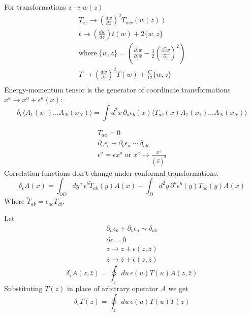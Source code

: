 \documentclass[a4paper,12pt]{article}
\theoremstyle{definition} \newtheorem{Def}{Definition}
\begin{document}
For transformations $z\to w(z)$
\begin{equation}
  \label{eq:51}
  \begin{split}
    T_{zz}\to \left(\frac{dw}{dz}\right)^2 T_{ww}(w(z))\\
    t\to \left(\frac{dw}{dz}\right)t(w)+2\{w,z\}\\
    \mbox{where}\; \{w,z\}=\left(\frac{\partial_z^3 w}{\partial_z w}-\frac{3}{2}\left(\frac{\partial_z^2 w}{\partial_z}\right)^2\right)\\
    T\to \left(\frac{dw}{dz}\right)^2 T(w)+\frac{C}{12}\{w,z\}\\
  \end{split}
\end{equation}
Energy-momentum tensor is the generator of coordinate transformations $x^a\to x^a+\epsilon^a(x)$:
\begin{equation}
  \label{eq:52}
  \delta_{\epsilon}\langle A_1(x_1)\dots A_N(x_N)\rangle = \int d^2x\, \partial_a \epsilon_b(x)\langle T_{ab}(x) A_1(x_1)\dots A_N(x_N)\rangle
\end{equation}

\begin{equation}
  \label{eq:53}
  \begin{split}
    T_{aa}=0\\
    \partial_a \epsilon_b+\partial_b \epsilon_a\sim \delta_{ab}\\
    \epsilon^a=\epsilon x^a \;\mbox{or}\; x^a\to \frac{x^a}{(\vec x)^2}
  \end{split}
\end{equation}
Correlation functions don't change under conformal transformations.
\begin{equation}
  \label{eq:54}
  \delta_{\epsilon}A(x)=\int_{\partial D} dy^a\, \epsilon^b \tilde{T}_{ab}(y)A(x)-\int_{D}d^2y\, \partial^a \epsilon^b(y)T_{ab}(y)A(x)
\end{equation}
Where $\tilde{T}_{ab}=\epsilon_{ac}T_{cb}$.

Let
\begin{equation}
  \label{eq:55}
  \begin{split}
    \partial_a \epsilon_b+\partial_b \epsilon_a\sim \delta_{ab}\\
    \bar{\partial}\epsilon=0\\
    z\to z+\epsilon(z,\bar{z})\\
    \bar{z}\to\bar{z}+\bar{\epsilon}(z,\bar{z})
  \end{split}
\end{equation}
\begin{equation}
  \label{eq:56}
  \delta_{\epsilon}A(z,\bar{z})=\oint_z du\, \epsilon(u) T(u) A(z,\bar{z})
\end{equation}
Substituting $T(z)$ in place of arbitrary operator $A$ we get 
\begin{equation}
  \label{eq:57}
  \delta_{\epsilon}T(z)=\oint_z du\, \epsilon(u)T(u)T(z)
\end{equation}
\end{document}
